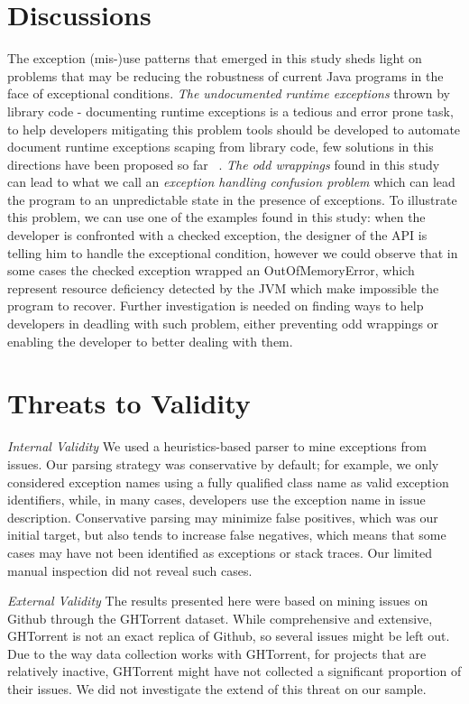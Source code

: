 \documentclass[conference]{IEEEtran}
\begin{document}
\section{Discussions}

The exception (mis-)use patterns that emerged  in this study sheds light on 
problems that may be reducing the robustness of current Java programs in the face of
exceptional conditions. \noindent\emph{The undocumented runtime exceptions} thrown by library code -
documenting runtime exceptions is a tedious and error prone task, to help developers
mitigating this problem tools should be developed to automate document runtime exceptions
scaping from library code, few solutions in this directions have been proposed so far ~\cite{van2005combining}. 
 \noindent\emph{The odd wrappings}  found in this study can lead to what we call
an \emph{exception handling confusion problem} which can lead the program to
an unpredictable state in the presence of exceptions. To illustrate this problem, we can use
 one of the examples found in this study: when the developer is 
confronted with a checked exception, the designer of the API is telling him 
to handle the exceptional condition, however we could observe that in some cases the 
checked exception wrapped an OutOfMemoryError, which represent resource deficiency detected 
by the JVM which make impossible the program to recover. Further investigation is needed on finding 
ways to help developers in deadling with such problem, either preventing odd wrappings or enabling 
the developer to better dealing with them. 


\section{Threats to Validity}

\noindent\emph{Internal Validity} We used a heuristics-based parser to mine
exceptions from issues.  Our parsing strategy was conservative by default; for
example, we only considered exception names using a fully qualified class name
as valid exception identifiers, while, in many cases, developers use the
exception name in issue description. Conservative parsing may minimize false
positives, which was our initial target, but also tends to increase false
negatives, which means that some cases may have not been identified as
exceptions or stack traces. Our limited manual inspection did not reveal such
cases.

\noindent\emph{External Validity} The results presented here were based on mining
issues on Github through the GHTorrent dataset. While comprehensive and
extensive, GHTorrent is not an exact replica of Github, so several issues might
be left out. Due to the way data collection works with GHTorrent, for projects
that are relatively inactive, GHTorrent might have not collected a significant
proportion of their issues. We did not investigate the extend of this threat on
our sample.
\end{document}
